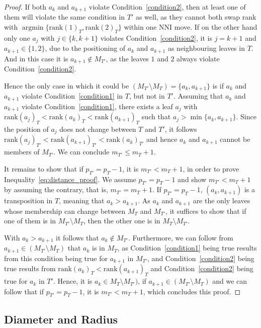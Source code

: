 \documentclass[11pt]{amsart}
\newcommand{\rank}{\mathrm{rank}}
\newcommand{\nni}{\mathrm{NNI}}
\DeclareMathOperator*{\argmin}{argmin}
\begin{document}
\begin{proof}
	If both $a_k$ and $a_{k+1}$ violate Condition~\ref{condition2}, then at least one of them will violate the same condition in $T'$ as well, as they cannot both swap rank with $\argmin\{\rank(1)_T, \rank(2)_T\}$ within one $\nni$ move.
	If on the other hand only one $a_j$ with $j \in \{k, k+1\}$ violates Condition~\ref{condition2}, it is $j = k+1$ and $a_{k+1} \in \{1,2\}$, due to the positioning of $a_k$ and $a_{k+1}$ as neighbouring leaves in $T$.
	And in this case it is $a_{k+1} \notin M_{T'}$, as the leaves $1$ and $2$ always violate Condition~\ref{condition2}.

	Hence the only case in which it could be $(M_{T'} \setminus M_T) = \{a_k, a_{k+1}\}$ is if $a_k$ and $a_{k+1}$ violate Condition~\ref{condition1} in $T$, but not in $T'$.
	Assuming that $a_k$ and $a_{k+1}$ violate Condition~\ref{condition1}, there exists a leaf $a_j$ with $\rank(a_j)_T < \rank(a_k)_T < \rank(a_{k+1})_T$ such that $a_j > \min\{a_k,a_{k+1}\}$.
	Since the position of $a_j$ does not change between $T$ and $T'$, it follows $\rank(a_j)_{T'} < \rank(a_{k+1})_{T'} < \rank(a_{k})_{T'}$ and hence $a_k$ and $a_{k+1}$ cannot be members of $M_{T'}$.
	We can conclude $m_{T'} \leq m_T + 1$.

	It remains to show that if $p_{T'} = p_T - 1$, it is $m_{T'} < m_T + 1$, in order to prove Inequality~\ref{eq:distance_proof}.
	We assume $p_{T'} = p_T - 1$ and show $m_{T'} < m_T + 1$ by assuming the contrary, that is, $m_{T'} = m_T + 1$.
	If $p_{T'} = p_T - 1$, $(a_k, a_{k+1})$ is a transposition in $T$, meaning that $a_k > a_{k+1}$.
	As $a_k$ and $a_{k+1}$ are the only leaves whose membership can change between $M_T$ and $M_{T'}$, it suffices to show that if one of them is in $M_{T'} \setminus M_T$, then the other one is in $M_T \setminus M_{T'}$.

	With $a_k > a_{k+1}$ it follows that $a_k \notin M_{T'}$.
	Furthermore, we can follow from $a_{k+1} \in (M_{T'} \setminus M_T)$ that $a_k$ is in $M_T$, as Condition~\ref{condition1} being true results from this condition being true for $a_{k+1}$ in $M_{T'}$, and Condition~\ref{condition2} being true results from $\rank(a_k)_T < \rank(a_{k+1})_T$ and Condition~\ref{condition2} being true for $a_k$ in $T'$.
	Hence, it is $a_k \in M_T \setminus M_{T'})$, if $a_{k+1} \in (M_{T'} \setminus M_T)$ and we can follow that if $p_{T'} = p_T - 1$, it is $m_{T'} < m_T + 1$, which concludes this proof.
\end{proof}

\subsection{Diameter and Radius}
\end{document}

